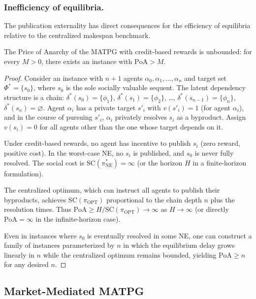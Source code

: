 \subsubsection{Inefficiency of equilibria.}

The publication externality has direct consequences for the efficiency of equilibria relative to the centralized makespan benchmark.

\begin{theorem}\label{thm:unbounded-poa}
The Price of Anarchy of the MATPG with credit-based rewards is unbounded: for every $M > 0$, there exists an instance with $\mathrm{PoA} > M$.
\end{theorem}

\begin{proof}
Consider an instance with $n+1$ agents $\alpha_0,\alpha_1,\dots,\alpha_n$ and target set $\Phi^* = \{s_0\}$, where $s_0$ is the sole socially valuable sequent. The latent dependency structure is a chain: $\delta^*(s_0) = \{\phi_1\}$, $\delta^*(s_1) = \{\phi_2\}$, \ldots, $\delta^*(s_{n-1}) = \{\phi_n\}$, $\delta^*(s_n) = \varnothing$. Agent $\alpha_i$ has a private target $s'_i$ with $v(s'_i)=1$ (for agent $\alpha_i$), and in the course of pursuing $s'_i$, $\alpha_i$ privately resolves $s_i$ as a byproduct. Assign $v(s_i)=0$ for all agents other than the one whose target depends on it.

Under credit-based rewards, no agent has incentive to publish $s_i$ (zero reward, positive cost). In the worst-case NE, no $s_i$ is published, and $s_0$ is never fully resolved. The social cost is $\mathrm{SC}(\pi^*_{\mathrm{NE}}) = \infty$ (or the horizon $H$ in a finite-horizon formulation).

The centralized optimum, which can instruct all agents to publish their byproducts, achieves $\mathrm{SC}(\pi_{\mathrm{OPT}})$ proportional to the chain depth $n$ plus the resolution times. Thus $\mathrm{PoA} \ge H / \mathrm{SC}(\pi_{\mathrm{OPT}}) \to \infty$ as $H\to\infty$ (or directly $\mathrm{PoA} = \infty$ in the infinite-horizon case).

Even in instances where $s_0$ is eventually resolved in some NE, one can construct a family of instances parameterized by $n$ in which the equilibrium delay grows linearly in $n$ while the centralized optimum remains bounded, yielding $\mathrm{PoA} \ge n$ for any desired $n$.
\end{proof}


\subsection{Market-Mediated MATPG}\label{sec:market-matp}

